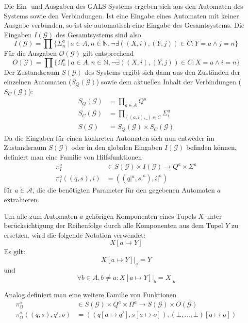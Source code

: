 Die Ein- und Ausgaben des GALS Systems ergeben sich aus den Automaten des Systems sowie den Verbindungen.
Ist eine Eingabe eines Automaten mit keiner Ausgabe verbunden, so ist sie automatisch eine Eingabe des Gesamtsystems.
Die Eingaben $I(\mathcal{G})$ des Gesamtsystems sind also
\[ I(\mathcal{G}) = \prod \{ \Sigma^a_n\ |\ a\in A, n\in \mathbb{N}, \lnot\exists ((X,i),(Y,j))\in C: Y=a\land j=n \} \]
Für die Ausgaben $O(\mathcal{G})$ gilt entsprechend
\[ O(\mathcal{G}) = \prod \{ \Omega^a_n\ |\ a\in A, n\in \mathbb{N}, \lnot\exists ((X,i),(Y,j))\in C: X=a\land i=n \} \]
Der Zustandsraum $S(\mathcal{G})$ des Systems ergibt sich dann aus den Zuständen der einzelnen Automaten ($S_Q(\mathcal{G})$) sowie dem aktuellen Inhalt der Verbindungen ($S_C(\mathcal{G})$):
\begin{align*}
  S_Q(\mathcal{G}) &= \prod_{a\in A} Q^a\\
  S_C(\mathcal{G}) &= \prod_{((a,i),\_)\in C} \Sigma^a_i\\
  S(\mathcal{G}) &= S_Q(\mathcal{G})\times S_C(\mathcal{G})
\end{align*}
Da die Eingaben für einen konkreten Automaten sich nun entweder im Zustandsraum $S(\mathcal{G})$ oder in den globalen Eingaben $I(\mathcal{G})$ befinden können, definiert man eine Familie von Hilfsfunktionen
\begin{align*}
  \pi_I^a &\in S(\mathcal{G})\times I(\mathcal{G})\rightarrow Q^a\times\Sigma^a\\
  \pi_I^a((q,s),i) &= ((q|^a,s|^a),i|^a)
\end{align*}
für $a\in\mathcal{A}$, die die benötigten Parameter für den gegebenen Automaten $a$ extrahieren.
\begin{notation}
  Um alle zum Automaten $a$ gehörigen Komponenten eines Tupels $X$ unter berücksichtigung der Reihenfolge durch alle Komponenten aus dem Tupel $Y$ zu ersetzen, wird die folgende Notation verwendet:
  \[ X[a\mapsto Y] \]
  Es gilt:
  \[ \left.X[a\mapsto Y]\right|_a = Y \]
  und
  \[ \forall b\in A,b\neq a: \left.X[a\mapsto Y]\right|_b = X|_b \]
\end{notation}
Analog definiert man eine weitere Familie von Funktionen
\begin{align*}
  \pi_O^a &\in S(\mathcal{G})\times Q^a\times\Omega^a\rightarrow S(\mathcal{G})\times O(\mathcal{G})\\
  \pi_O^a ((q,s),q',o) &= ((q[a\mapsto q'],s[a\mapsto o]),(\bot,\dots,\bot)[a\mapsto o])
\end{align*}
